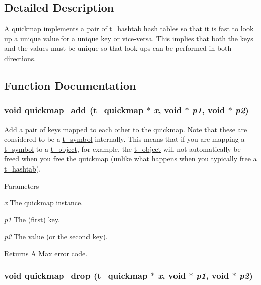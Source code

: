 \subsection{Detailed Description}
A quickmap implements a pair of \hyperlink{structt__hashtab}{t\_\-hashtab} hash tables so that it is fast to look up a unique value for a unique key or vice-\/versa. This implies that both the keys and the values must be unique so that look-\/ups can be performed in both directions. 

\subsection{Function Documentation}
\hypertarget{group__quickmap_ga4fd087f1aa587108d26d5a377efb0d0b}{
\subsubsection[{quickmap\_\-add}]{\setlength{\rightskip}{0pt plus 5cm}void quickmap\_\-add ({\bf t\_\-quickmap} $\ast$ {\em x}, \/  void $\ast$ {\em p1}, \/  void $\ast$ {\em p2})}}
\label{group__quickmap_ga4fd087f1aa587108d26d5a377efb0d0b}


Add a pair of keys mapped to each other to the quickmap. Note that these are considered to be a \hyperlink{structt__symbol}{t\_\-symbol} internally. This means that if you are mapping a \hyperlink{structt__symbol}{t\_\-symbol} to a \hyperlink{structt__object}{t\_\-object}, for example, the \hyperlink{structt__object}{t\_\-object} will not automatically be freed when you free the quickmap (unlike what happens when you typically free a \hyperlink{structt__hashtab}{t\_\-hashtab}).


\begin{DoxyParams}{Parameters}
\item[{\em x}]The quickmap instance. \item[{\em p1}]The (first) key. \item[{\em p2}]The value (or the second key). \end{DoxyParams}
\begin{DoxyReturn}{Returns}
A Max error code. 
\end{DoxyReturn}
\hypertarget{group__quickmap_ga4bcc531dc606835a05358aa4ca0f92d1}{
\subsubsection[{quickmap\_\-drop}]{\setlength{\rightskip}{0pt plus 5cm}void quickmap\_\-drop ({\bf t\_\-quickmap} $\ast$ {\em x}, \/  void $\ast$ {\em p1}, \/  void $\ast$ {\em p2})}}
\label{group__quickmap_ga4bcc531dc606835a05358aa4ca0f92d1}


